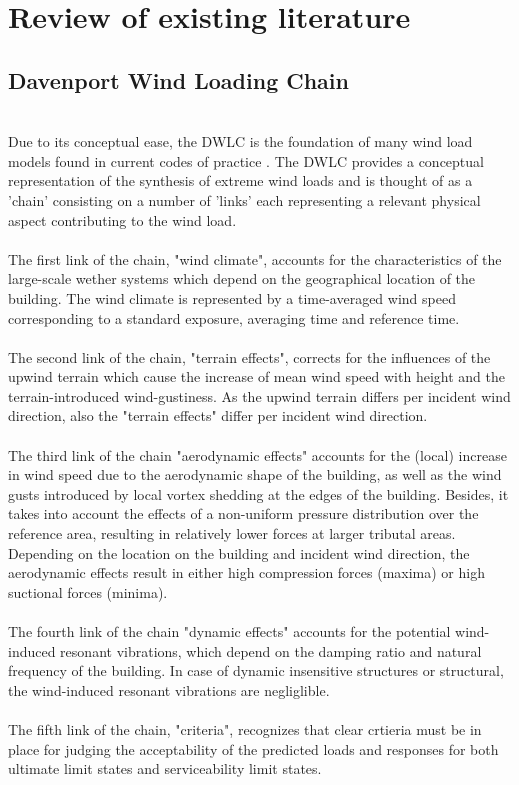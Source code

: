 \documentclass[fleqn]{article}
\begin{document}
\section{Review of existing literature} 
 

\subsection{Davenport Wind Loading Chain}
\\
Due to its conceptual ease, the DWLC is the foundation of many wind load models found in current codes of practice \cite{Davenport_2002}. The DWLC provides a conceptual representation of the synthesis of extreme wind loads and is thought of as a 'chain' consisting on a number of 'links' each representing a relevant physical aspect contributing to the wind load. \\
\\
The first link of the chain, "wind climate", accounts for the characteristics of the large-scale wether systems which depend on the geographical location of the building. The wind climate is represented by a time-averaged wind speed corresponding to a standard exposure, averaging time and reference time. \\
\\
The second link of the chain, "terrain effects", corrects for the influences of the upwind terrain which cause the increase of mean wind speed with height and the terrain-introduced wind-gustiness. As the upwind terrain differs per incident wind direction, also the "terrain effects" differ per incident wind direction.  \\
\\
The third link of the chain "aerodynamic effects" accounts for the (local) increase in wind speed due to the aerodynamic shape of the building, as well as the wind gusts introduced by local vortex shedding at the edges of the building. Besides, it takes into account the effects of a non-uniform pressure distribution over the reference area, resulting in relatively lower forces at larger tributal areas. Depending on the location on the building and incident wind direction, the aerodynamic effects result in either high compression forces (maxima) or high suctional forces (minima). \\
\\
The fourth link of the chain "dynamic effects" accounts for the potential wind-induced resonant vibrations, which depend on the damping ratio and natural frequency of the building.  
In case of dynamic insensitive structures or structural, the wind-induced resonant vibrations are negliglible. \\
\\
The fifth link of the chain, "criteria", recognizes that clear crtieria must be in place for judging the acceptability of the predicted loads and responses for both ultimate limit states and serviceability limit states. 
\end{document}
